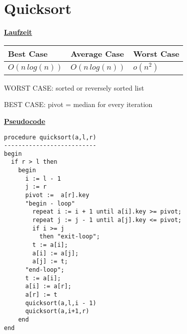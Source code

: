 \documentclass[a4paper]{report}
\begin{document}
\chapter*{Quicksort}

\underline{\bf{Laufzeit}}


\begin{tabular}{|l|l|l|}
\hline
Best Case    & Average Case  &  Worst Case\\ \hline
$O(n\,log(n))$ & $O(n\,log(n))$  &  $o(n^2)$  \\ \hline
\end{tabular}


WORST CASE: sorted or reversely sorted list



BEST CASE: pivot = median for every iteration

\underline{\bf{Pseudocode}}

\begin{lstlisting}
procedure quicksort(a,l,r)
--------------------------
begin
  if r > l then    
    begin
      i := l - 1
      j := r
      pivot :=  a[r].key
      "begin - loop"
        repeat i := i + 1 until a[i].key >= pivot;
        repeat j := j - 1 until a[j].key <= pivot;
        if i >= j
          then "exit-loop";
        t := a[i];
        a[i] := a[j];
        a[j] := t;
      "end-loop";
      t := a[i];
      a[i] := a[r];
      a[r] := t
      quicksort(a,l,i - 1)
      quicksort(a,i+1,r)
    end
end 
\end{lstlisting}
\end{document}
